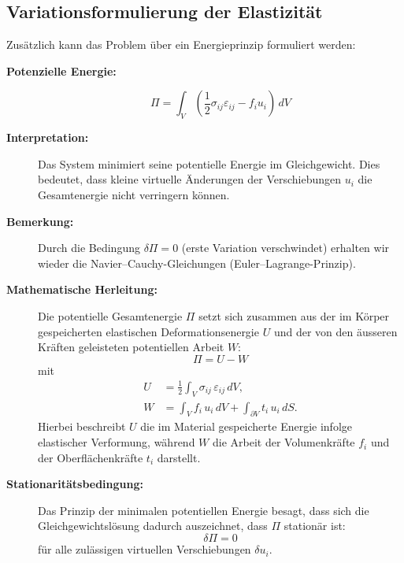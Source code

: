 \subsection{Variationsformulierung der Elastizität}
Zusätzlich kann das Problem über ein Energieprinzip formuliert werden:

\begin{description}
	\item[\textbf{Potenzielle Energie:}]
	\begin{equation}
		\Pi = \int_V \left( \frac{1}{2} \sigma_{ij} \varepsilon_{ij} - f_i u_i \right) \, dV
	\end{equation}
	
	\item[\textbf{Interpretation:}] 
	Das System minimiert seine potentielle Energie im Gleichgewicht. 
	Dies bedeutet, dass kleine virtuelle Änderungen der Verschiebungen $u_i$ die Gesamtenergie nicht verringern können.
	
	\item[\textbf{Bemerkung:}] 
	Durch die Bedingung $\delta \Pi = 0$ (erste Variation verschwindet) erhalten wir wieder die Navier–Cauchy-Gleichungen (Euler–Lagrange-Prinzip).
	
	\item[\textbf{Mathematische Herleitung:}] 
	Die potentielle Gesamtenergie $\Pi$ setzt sich zusammen aus der im Körper gespeicherten elastischen Deformationsenergie $U$ und der von den äusseren Kräften geleisteten potentiellen Arbeit $W$:
	\begin{equation}
		\Pi = U - W
	\end{equation}
	mit
	\begin{align}
		U &= \frac{1}{2} \int_V \sigma_{ij} \, \varepsilon_{ij} \, dV, \\
		W &= \int_V f_i \, u_i \, dV + \int_{\partial V} t_i \, u_i \, dS.
	\end{align}
	Hierbei beschreibt $U$ die im Material gespeicherte Energie infolge elastischer Verformung, während $W$ die Arbeit der Volumenkräfte $f_i$ und der Oberflächenkräfte $t_i$ darstellt.
	
	\item[\textbf{Stationaritätsbedingung:}]
	Das Prinzip der minimalen potentiellen Energie besagt, dass sich die Gleichgewichtslösung dadurch auszeichnet, dass $\Pi$ stationär ist:
	\begin{equation}
		\delta \Pi = 0
	\end{equation}
	für alle zulässigen virtuellen Verschiebungen $\delta u_i$.
	

\end{description}
